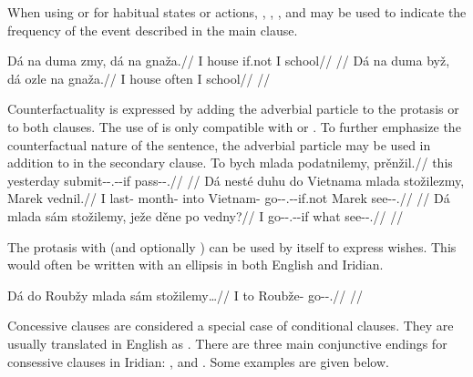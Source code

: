 When using  or  for habitual states or actions,
, , ,
 and  may be used to indicate the frequency
of the event described in the main clause.

\pex
	\a
	\begingl
		\gla Dá na duma zmy, dá na gnaža.//
		\glb I \Loc{} house if.not I \Loc{} school//
		\glft {}//
	\endgl
	\a
	\begingl
		\gla Dá na duma byž, dá ozle na gnaža.//
		\glb I \Loc{} house often I \Loc{} school//
		\glft {}//
	\endgl
\xe

Counterfactuality is expressed by adding the adverbial particle  to
the protasis or to both clauses. The use of  is only compatible with
 or . To further emphasize the counterfactual nature of the
sentence, the adverbial particle  may be used in addition to
 in the secondary clause.
\pex
	\a
	\begingl
		\gla To bych mlada podatnilemy, prěnžil.//
		\glb this yesterday \Hyp{} submit-\Pv{}-\Cond{}.\Pf{}-\Cnj{}-if pass-\Av{}-\Cond{}.\Pf{}//
		\glft {}//
	\endgl
	\a
	\begingl
		\gla Dá nesté duhu do Vietnama mlada stožilezmy, Marek vednil.//
		\glb I last-\Att{} month-\Ins{} into Vietnam-\Acc{} \Hyp{} go-\Av{}-\Cond{}.\Pf{}-\Cnj{}-if.not Marek see-\Pv{}-\Cond{}.\Pf{}//
		\glft {}//
	\endgl
  \a
  \begingl
    \gla Dá mlada sám stožilemy, ježe děne po vedny?//
    \glb I \Hyp{} \Excl{} go-\Av{}-\Cond{}.\Pf{}-\Cnj{}-if what \Spec{} \Ipfv{} see-\Pv{}-\Cond{}.\Ipf{}//
    \glft {}//
  \endgl
  \xe

The protasis with  (and optionally ) can be used by itself
to express wishes. This would often be written with an ellipsis in both English
and Iridian.

\pex
  \begingl
  \gla Dá do Roubžy mlada sám stožilemy\ldots//
  \glb I to Roubže-\Acc{} \Hyp{} \Excl{} go-\Av{}-\Cond{}.\Pf{}//
  \glft {}//
  \endgl
\xe

Concessive clauses are considered a special case of conditional clauses. They
are usually translated in English as . There are three main
conjunctive endings for consessive clauses in Iridian: ,
 and . Some examples are given
below.

